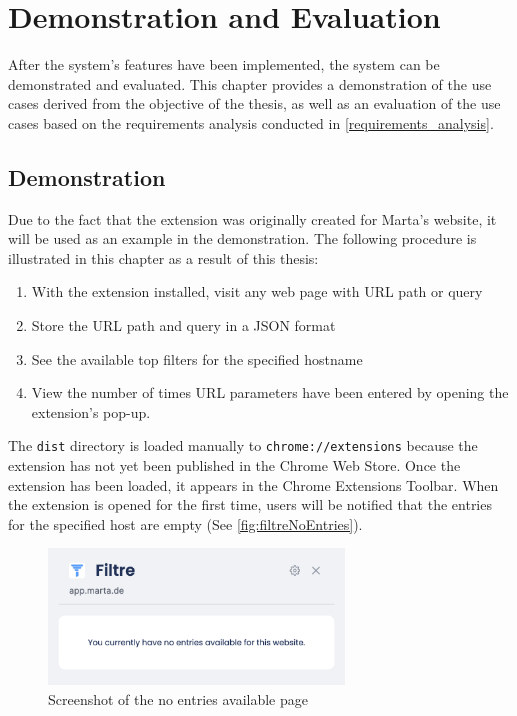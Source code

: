 \newpage
\chapter{Demonstration and Evaluation}
After the system's features have been implemented, the system can be demonstrated and evaluated. This chapter provides a demonstration of the use cases derived from the objective of the thesis, as well as an evaluation of the use cases based on the requirements analysis conducted in \autoref{requirements_analysis}.

\section{Demonstration}
Due to the fact that the extension was originally created for Marta's website, it will be used as an example in the demonstration. The following procedure is illustrated in this chapter as a result of this thesis:

\begin{enumerate}
  \item With the extension installed, visit any web page with URL path or query
  \item Store the URL path and query in a JSON format
  \item See the available top filters for the specified hostname
  \item View the number of times URL parameters have been entered by opening the extension's pop-up.
\end{enumerate}

The \texttt{dist} directory is loaded manually to \verb;chrome://extensions; because the extension has not yet been published in the Chrome Web Store. Once the extension has been loaded, it appears in the Chrome Extensions Toolbar. When the extension is opened for the first time, users will be notified that the entries for the specified host are empty (See \autoref{fig:filtreNoEntries}).

\begin{figure}[H]
  \centering
  \includegraphics[width=0.7\textwidth]{assets/screenshot_filtre_no_entries.png}
  \caption{Screenshot of the no entries available page}
  \label{fig:filtreNoEntries}
\end{figure}

